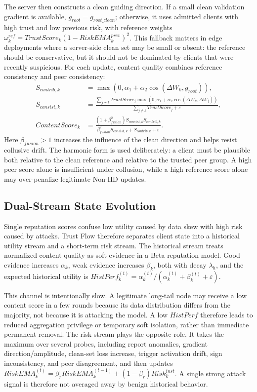 \documentclass[runningheads,orivec]{llncs}
\begin{document}
The server then constructs a clean guiding direction. If a small clean validation gradient is available, $g_{root}=g_{root\_clean}$; otherwise, it uses admitted clients with high trust and low previous risk, with reference weights $\omega_k^{ref}=TrustScore_k(1-RiskEMA_k^{prev})^2$. This fallback matters in edge deployments where a server-side clean set may be small or absent: the reference should be conservative, but it should not be dominated by clients that were recently suspicious. For each update, content quality combines reference consistency and peer consistency:
\begin{align}
    S_{contrib,k}  & =\max(0,\alpha_1+\alpha_2\cos(\Delta W_k,g_{root})),                                  \\
    S_{consist,k}  & =\frac{\sum_{j\ne k}TrustScore_j\max(0,\alpha_1+\alpha_2\cos(\Delta W_k,\Delta W_j))}
    {\sum_{j\ne k}TrustScore_j+\varepsilon},                                                               \\
    ContentScore_k & =\frac{(1+\beta_{fusion}^2)S_{consist,k}S_{contrib,k}}
    {\beta_{fusion}^2S_{consist,k}+S_{contrib,k}+\varepsilon}.
\end{align}
Here $\beta_{fusion}>1$ increases the influence of the clean direction and helps resist collusive drift. The harmonic form is used deliberately: a client must be plausible both relative to the clean reference and relative to the trusted peer group. A high peer score alone is insufficient under collusion, while a high reference score alone may over-penalize legitimate Non-IID updates.

\subsection{Dual-Stream State Evolution}

Single reputation scores confuse low utility caused by data skew with high risk caused by attacks. Trust Flow therefore separates client state into a historical utility stream and a short-term risk stream. The historical stream treats normalized content quality as soft evidence in a Beta reputation model. Good evidence increases $\alpha_k$, weak evidence increases $\beta_k$, both with decay $\lambda_h$, and the expected historical utility is $HistPerf_k^{(t)}=\alpha_k^{(t)}/(\alpha_k^{(t)}+\beta_k^{(t)}+\varepsilon)$.

This channel is intentionally slow. A legitimate long-tail node may receive a low content score in a few rounds because its data distribution differs from the majority, not because it is attacking the model. A low $HistPerf$ therefore leads to reduced aggregation privilege or temporary soft isolation, rather than immediate permanent removal. The risk stream plays the opposite role. It takes the maximum over several probes, including report anomalies, gradient direction/amplitude, clean-set loss increase, trigger activation drift, sign inconsistency, and peer disagreement, and then updates $RiskEMA_k^{(t)}=\beta_rRiskEMA_k^{(t-1)}+(1-\beta_r)Risk_k^{inst}$. A single strong attack signal is therefore not averaged away by benign historical behavior.
\end{document}
